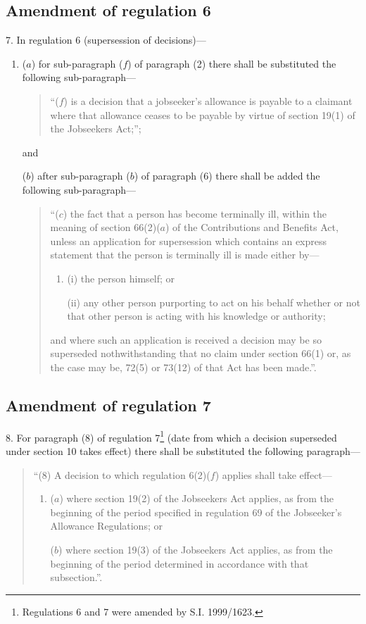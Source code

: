 \documentclass[12pt,a4paper]{article}
\begin{document}
\subsection[7. Amendment of regulation 6]{Amendment of regulation 6}

7.  In regulation 6 (supersession of decisions)—
\begin{enumerate}\item[]
($a$) for sub-paragraph ($f$)  of paragraph (2) there shall be substituted the following sub-paragraph—
\begin{quotation}
“($f$) is a decision that a jobseeker’s allowance is payable to a claimant where that allowance ceases to be payable by virtue of section 19(1) of the Jobseekers Act;”;
\end{quotation}
    and 

($b$) after sub-paragraph ($b$) of paragraph (6) there shall be added the following sub-paragraph—
\begin{quotation}
“($c$) the fact that a person has become terminally ill, within the meaning of section 66(2)($a$) of the Contributions and Benefits Act, unless an application for supersession which contains an express statement that the person is terminally ill is made either by—
\begin{enumerate}\item[]
(i) the person himself; or

(ii) any other person purporting to act on his behalf whether or not that other person is acting with his knowledge or authority;
\end{enumerate}
and where such an application is received a decision may be so superseded nothwithstanding that no claim under section 66(1) or, as the case may be, 72(5) or 73(12) of that Act has been made.”.
\end{quotation}
\end{enumerate}

\subsection[8. Amendment of regulation 7]{Amendment of regulation 7}

8.  For paragraph (8) of regulation 7\footnote{\frenchspacing Regulations 6 and 7 were amended by S.I. 1999/1623.} (date from which a decision superseded under section 10 takes effect) there shall be substituted the following paragraph—
\begin{quotation}
“(8) A decision to which regulation 6(2)($f$)  applies shall take effect—
\begin{enumerate}\item[]
($a$) where section 19(2) of the Jobseekers Act applies, as from the beginning of the period specified in regulation 69 of the Jobseeker’s Allowance Regulations; or

($b$) where section 19(3) of the Jobseekers Act applies, as from the beginning of the period determined in accordance with that subsection.”.
\end{enumerate}
\end{quotation}
\end{document}
